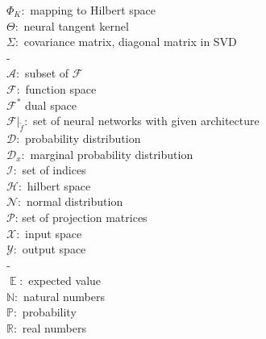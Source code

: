 \documentclass[11pt, a4paper]{article}
\newcommand{\N}{\mathbb{N}}
\newcommand{\R}{\mathbb{R}}
\newcommand{\A}{\mathcal{A}}
\newcommand{\D}{\mathcal{D}}
\newcommand{\F}{\mathcal{F}}
\newcommand{\I}{\mathcal{I}}
\newcommand{\X}{\mathcal{X}}
\newcommand{\Y}{\mathcal{Y}}
\renewcommand{\H}{\mathcal{H}}
\renewcommand{\P}{\mathcal{P}}
\DeclareMathOperator*{\E}{\mathbb{E}}
\begin{document}
$\Phi_K:$ mapping to Hilbert space \\ 
$\Theta:$ neural tangent kernel \\
$\Sigma:$ covariance matrix, diagonal matrix in SVD \\
- \\
$\A:$ subset of $\F$ \\
$\F:$ function space \\
$\F^*$ dual space \\
$\F |_{\tilde{f}}:$ set of neural networks with given architecture \\
$\D:$ probability distribution \\
$\D_x:$ marginal probability distribution \\
$\I:$ set of indices \\
$\H:$ hilbert space \\
$\mathcal{N}:$ normal distribution \\
$\P$: set of projection matrices \\
$\X:$ input space \\
$\Y:$ output space \\
- \\
$\E:$ expected value \\
$\N:$ natural numbers \\
$\mathbb{P}:$ probability \\
$\R:$ real numbers \\
\end{document}
